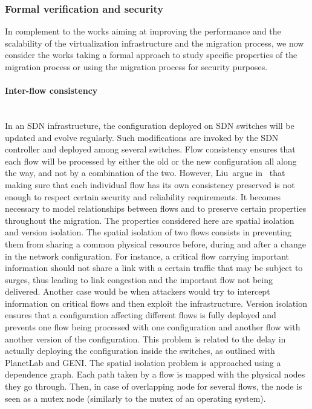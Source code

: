 \subsubsection{Formal verification and security}
In complement to the works aiming at improving the performance and the scalability of the virtualization infrastructure and the migration process, we now consider the works taking a formal approach to study specific properties of the migration process or using the migration process for security purposes.

\paragraph{Inter-flow consistency}\textbf{\\}
In an SDN infrastructure, the configuration deployed on SDN switches will be updated and evolve regularly. Such modifications are invoked by the SDN controller and deployed among several switches.
Flow consistency ensures that each flow will be processed by either the old or the new configuration all along the way, and not by a combination of the two.
However, Liu~\etal argue in~\cite{Liu2015a} that making sure that each individual flow has its own consistency preserved is not enough to respect certain security and reliability requirements.
It becomes necessary to model relationships between flows and to preserve certain properties throughout the migration.
The properties considered here are spatial isolation and version isolation.
The spatial isolation of two flows consists in preventing them from sharing a common physical resource before, during and after a change in the network configuration.
For instance, a critical flow carrying important information should not share a link with a certain traffic that may be subject to surges, thus leading to link congestion and the important flow not being delivered. Another case would be when attackers would try to intercept information on critical flows and then exploit the infrastructure.
Version isolation ensures that a configuration affecting different flows is fully deployed and prevents one flow being processed with one configuration and another flow with another version of the configuration.
This problem is related to the delay in actually deploying the configuration inside the switches, as outlined with PlanetLab and GENI.
The spatial isolation problem is approached using a dependence graph. Each path taken by a flow is mapped with the physical nodes they go through. Then, in case of overlapping node for several flows, the node is seen as a mutex node (similarly to the mutex of an operating system).
